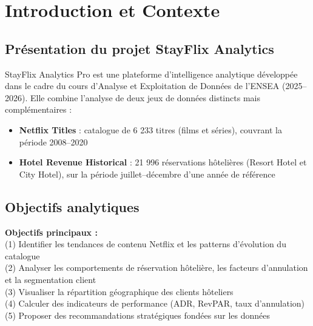 \documentclass[12pt,a4paper]{article}
\begin{document}
\tableofcontents
\newpage

\section{Introduction et Contexte}

\subsection{Présentation du projet StayFlix Analytics}

StayFlix Analytics Pro est une plateforme d'intelligence analytique développée dans le cadre du cours d'Analyse et Exploitation de Données de l'ENSEA (2025--2026). Elle combine l'analyse de deux jeux de données distincts mais complémentaires :

\begin{itemize}[leftmargin=1.5cm]
  \item \textcolor{netflix}{\textbf{Netflix Titles}} : catalogue de 6 233 titres (films et séries), couvrant la période 2008--2020
  \item \textcolor{hotel}{\textbf{Hotel Revenue Historical}} : 21 996 réservations hôtelières (Resort Hotel et City Hotel), sur la période juillet--décembre d'une année de référence
\end{itemize}

\subsection{Objectifs analytiques}

\begin{insightbox}[purple]
  \textbf{Objectifs principaux :} \\
  (1) Identifier les tendances de contenu Netflix et les patterns d'évolution du catalogue \\
  (2) Analyser les comportements de réservation hôtelière, les facteurs d'annulation et la segmentation client \\
  (3) Visualiser la répartition géographique des clients hôteliers \\
  (4) Calculer des indicateurs de performance (ADR, RevPAR, taux d'annulation) \\
  (5) Proposer des recommandations stratégiques fondées sur les données
\end{insightbox}
\end{document}
